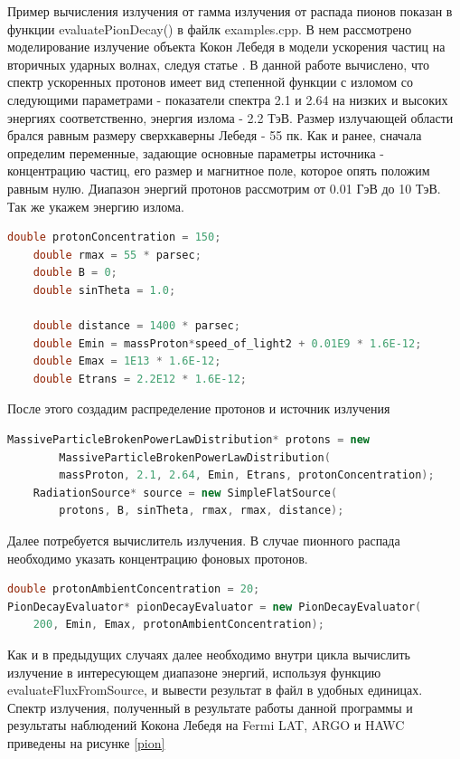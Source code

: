 Пример вычисления излучения от гамма излучения от распада пионов показан в функции evaluatePionDecay() в файлк examples.cpp. В нем рассмотрено моделирование излучение объекта Кокон Лебедя в модели ускорения частиц на вторичных ударных волнах, следуя статье \cite{BykovKalyashova2022}. В данной работе вычислено, что спектр ускоренных протонов имеет вид степенной функции с изломом со следующими параметрами - показатели спектра 2.1 и 2.64 на низких и высоких энергиях соответственно, энергия излома - 2.2 ТэВ. Размер излучающей области брался равным размеру сверхкаверны Лебедя - 55 пк. Как и ранее, сначала определим переменные, задающие основные параметры источника - концентрацию частиц, его размер и магнитное поле, которое опять положим равным нулю. Диапазон энергий протонов рассмотрим от 0.01 ГэВ до 10 ТэВ. Так же укажем энергию излома.
\begin{lstlisting}[language=c++]
	double protonConcentration = 150;
	double rmax = 55 * parsec;
	double B = 0;
	double sinTheta = 1.0;

	double distance = 1400 * parsec;
	double Emin = massProton*speed_of_light2 + 0.01E9 * 1.6E-12;
	double Emax = 1E13 * 1.6E-12;
	double Etrans = 2.2E12 * 1.6E-12;
\end{lstlisting}
После этого создадим распределение протонов и источник излучения
\begin{lstlisting}[language=c++]
	MassiveParticleBrokenPowerLawDistribution* protons = new 
		MassiveParticleBrokenPowerLawDistribution(
		massProton, 2.1, 2.64, Emin, Etrans, protonConcentration);
	RadiationSource* source = new SimpleFlatSource(
		protons, B, sinTheta, rmax, rmax, distance);
\end{lstlisting}
Далее потребуется вычислитель излучения. В случае пионного распада необходимо указать концентрацию фоновых протонов.
\begin{lstlisting}[language=c++]
double protonAmbientConcentration = 20;
PionDecayEvaluator* pionDecayEvaluator = new PionDecayEvaluator(
	200, Emin, Emax, protonAmbientConcentration);
\end{lstlisting}
Как и в предыдущих случаях далее необходимо внутри цикла вычислить излучение в интересующем диапазоне энергий, используя функцию evaluateFluxFromSource, и вывести результат в файл в удобных единицах. Спектр излучения, полученный в результате работы данной программы и результаты наблюдений Кокона Лебедя на Fermi LAT, ARGO и HAWC \cite{Ackermann2011, Bartoli2014, Abeysekara2021} приведены на рисунке \ref{pion}
